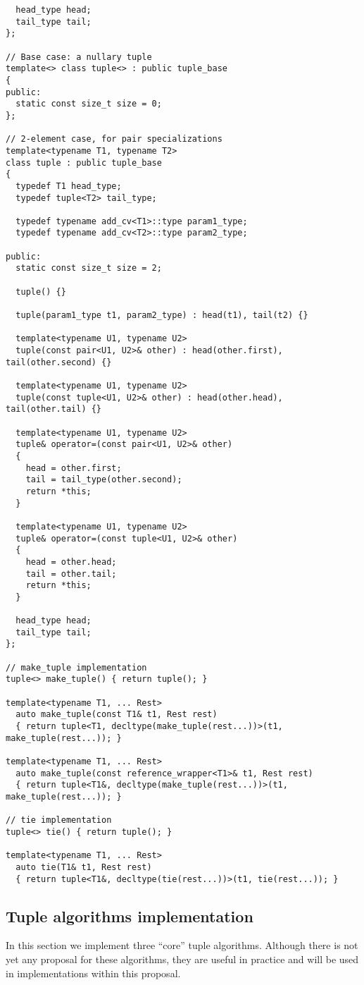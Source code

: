 \documentclass{article}
\begin{document}
\begin{verbatim}
  head_type head;
  tail_type tail;
};

// Base case: a nullary tuple
template<> class tuple<> : public tuple_base 
{
public:
  static const size_t size = 0;
};

// 2-element case, for pair specializations
template<typename T1, typename T2>
class tuple : public tuple_base 
{
  typedef T1 head_type;
  typedef tuple<T2> tail_type;

  typedef typename add_cv<T1>::type param1_type;
  typedef typename add_cv<T2>::type param2_type;

public:
  static const size_t size = 2;

  tuple() {}

  tuple(param1_type t1, param2_type) : head(t1), tail(t2) {}

  template<typename U1, typename U2>
  tuple(const pair<U1, U2>& other) : head(other.first), tail(other.second) {}

  template<typename U1, typename U2>
  tuple(const tuple<U1, U2>& other) : head(other.head), tail(other.tail) {}

  template<typename U1, typename U2>
  tuple& operator=(const pair<U1, U2>& other)
  {
    head = other.first;
    tail = tail_type(other.second);
    return *this;
  }

  template<typename U1, typename U2>
  tuple& operator=(const tuple<U1, U2>& other)
  {
    head = other.head;
    tail = other.tail;
    return *this;
  }

  head_type head;
  tail_type tail;
};

// make_tuple implementation
tuple<> make_tuple() { return tuple(); }

template<typename T1, ... Rest> 
  auto make_tuple(const T1& t1, Rest rest)
  { return tuple<T1, decltype(make_tuple(rest...))>(t1, make_tuple(rest...)); }

template<typename T1, ... Rest> 
  auto make_tuple(const reference_wrapper<T1>& t1, Rest rest)
  { return tuple<T1&, decltype(make_tuple(rest...))>(t1, make_tuple(rest...)); }

// tie implementation
tuple<> tie() { return tuple(); }

template<typename T1, ... Rest> 
  auto tie(T1& t1, Rest rest)
  { return tuple<T1&, decltype(tie(rest...))>(t1, tie(rest...)); }
\end{verbatim}
\normalsize

\subsection{Tuple algorithms implementation}
In this section we implement three ``core'' tuple algorithms.
Although there is not yet any proposal for these algorithms, they are
useful in practice and will be used in implementations within this
proposal.
\end{document}

